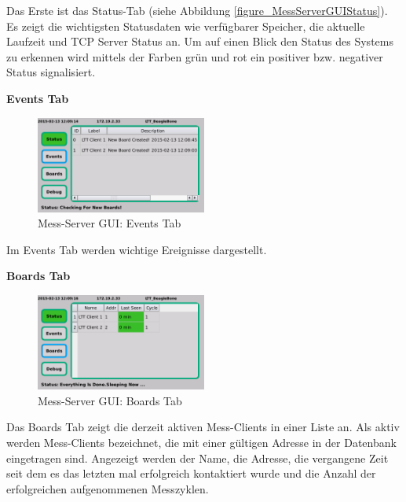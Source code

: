 Das Erste ist das Status-Tab (siehe Abbildung \ref{figure_MessServerGUIStatus}). Es zeigt die wichtigsten Statusdaten wie verfügbarer Speicher, die aktuelle Laufzeit und TCP Server Status an. Um auf einen Blick den Status des Systems zu erkennen wird mittels der Farben grün und rot ein positiver bzw. negativer Status signalisiert.

\textbf{Events Tab}

\begin{figure}[H]
\begin{center}
\includegraphics[width=0.5\textwidth ]{img/GUI/Server_GUI_Events1.png}
\caption{Mess-Server GUI: Events Tab}
\label{figure_MessServerGUIEvents}
\end{center}
\end{figure}

Im Events Tab werden wichtige Ereignisse dargestellt. 

\textbf{Boards Tab}

\begin{figure}[H]
\begin{center}
\includegraphics[width=0.5\textwidth ]{img/GUI/Server_GUI_Boards1.png}
\caption{Mess-Server GUI: Boards Tab}
\label{figure_MessServerGUIBoards}
\end{center}
\end{figure}

Das Boards Tab zeigt die derzeit aktiven Mess-Clients in einer Liste an. Als aktiv werden Mess-Clients bezeichnet, die mit einer gültigen Adresse in der Datenbank eingetragen sind. Angezeigt werden der Name, die Adresse, die vergangene Zeit seit dem es das letzten mal erfolgreich kontaktiert wurde und die Anzahl der erfolgreichen aufgenommenen Messzyklen.

